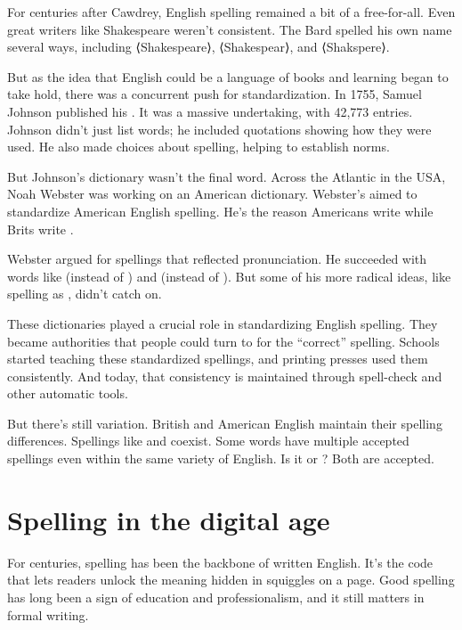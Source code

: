 For centuries after Cawdrey, English spelling remained a bit of a free-for-all. Even great writers like Shakespeare weren't consistent. The Bard spelled his own name several ways, including ⟨Shakespeare⟩, ⟨Shakespear⟩, and ⟨Shakspere⟩.

But as the idea that English could be a language of books and learning began to take hold, there was a concurrent push for standardization. In 1755, Samuel Johnson published his . It was a massive undertaking, with 42,773 entries. Johnson didn't just list words; he included quotations showing how they were used. He also made choices about spelling, helping to establish norms.

But Johnson's dictionary wasn't the final word. Across the Atlantic in the USA, Noah Webster was working on an American dictionary. Webster's  aimed to standardize American English spelling. He's the reason Americans write  while Brits write .

Webster argued for spellings that reflected pronunciation. He succeeded with words like  (instead of ) and  (instead of ). But some of his more radical ideas, like spelling  as , didn't catch on.

These dictionaries played a crucial role in standardizing English spelling. They became authorities that people could turn to for the ``correct'' spelling. Schools started teaching these standardized spellings, and printing presses used them consistently. And today, that consistency is maintained through spell-check and other automatic tools.

But there's still variation. British and American English maintain their spelling differences. Spellings like  and  coexist. Some words have multiple accepted spellings even within the same variety of English. Is it  or ? Both are accepted.

\section{Spelling in the digital age}

For centuries, spelling has been the backbone of written English. It's the code that lets readers unlock the meaning hidden in squiggles on a page. Good spelling has long been a sign of education and professionalism, and it still matters in formal writing.

